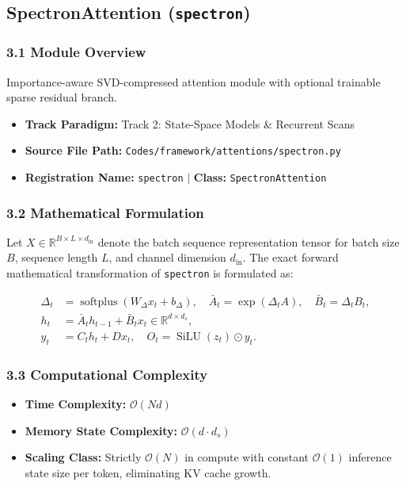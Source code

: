 \subsection{SpectronAttention (\texttt{spectron})}
\label{sec:app_module_spectron}

\subsubsection*{3.1 Module Overview}
Importance-aware SVD-compressed attention module with optional trainable sparse residual branch.
\begin{itemize}
    \item \textbf{Track Paradigm:} Track 2: State-Space Models \& Recurrent Scans
    \item \textbf{Source File Path:} \texttt{Codes/framework/attentions/spectron.py}
    \item \textbf{Registration Name:} \texttt{spectron} $\mid$ \textbf{Class:} \texttt{SpectronAttention}
\end{itemize}

\subsubsection*{3.2 Mathematical Formulation}
Let $X \in \mathbb{R}^{B \times L \times d_{\text{in}}}$ denote the batch sequence representation tensor for batch size $B$, sequence length $L$, and channel dimension $d_{\text{in}}$. The exact forward mathematical transformation of \texttt{spectron} is formulated as:

\begin{align}
\Delta_t &= \operatorname{softplus}(W_\Delta x_t + b_\Delta), \quad \bar{A}_t = \exp(\Delta_t A), \quad \bar{B}_t = \Delta_t B_t, \\
h_t &= \bar{A}_t h_{t-1} + \bar{B}_t x_t \in \mathbb{R}^{d \times d_s}, \\
y_t &= C_t h_t + D x_t, \quad O_t = \operatorname{SiLU}(z_t) \odot y_t.
\end{align}


\subsubsection*{3.3 Computational Complexity}
\begin{itemize}
    \item \textbf{Time Complexity:} $\mathcal{O}(N d)$
    \item \textbf{Memory State Complexity:} $\mathcal{O}(d \cdot d_s)$
    \item \textbf{Scaling Class:} Strictly $\mathcal{O}(N)$ in compute with constant $\mathcal{O}(1)$ inference state size per token, eliminating KV cache growth.
\end{itemize}

